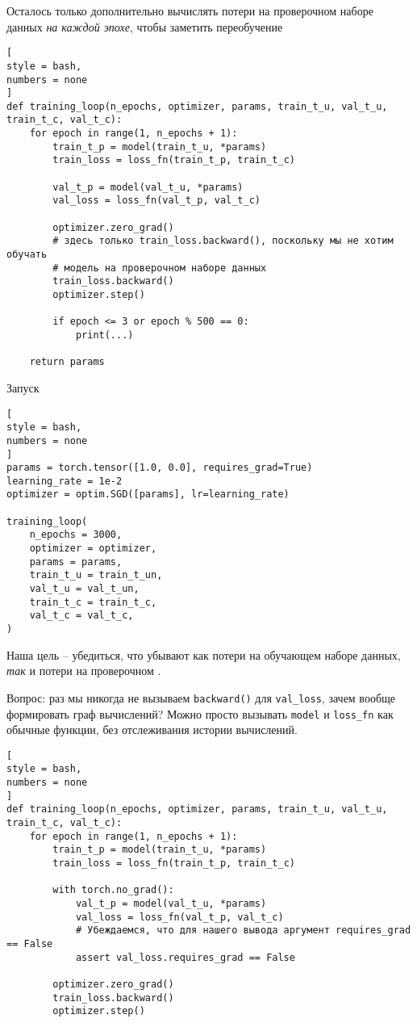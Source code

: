 \documentclass[%
	11pt,
	a4paper,
	utf8,
		]{article}
\begin{document}
Осталось только дополнительно вычислять потери на проверочном наборе данных \emph{на каждой эпохе}, чтобы заметить переобучение
\begin{lstlisting}[
style = bash,
numbers = none
]
def training_loop(n_epochs, optimizer, params, train_t_u, val_t_u, train_t_c, val_t_c):
    for epoch in range(1, n_epochs + 1):
        train_t_p = model(train_t_u, *params)
        train_loss = loss_fn(train_t_p, train_t_c)
        
        val_t_p = model(val_t_u, *params)
        val_loss = loss_fn(val_t_p, val_t_c)
        
        optimizer.zero_grad()
        # здесь только train_loss.backward(), поскольку мы не хотим обучать 
        # модель на проверочном наборе данных
        train_loss.backward()
        optimizer.step()
        
        if epoch <= 3 or epoch % 500 == 0:
            print(...)
            
    return params
\end{lstlisting}

Запуск
\begin{lstlisting}[
style = bash,
numbers = none	
]
params = torch.tensor([1.0, 0.0], requires_grad=True)
learning_rate = 1e-2
optimizer = optim.SGD([params], lr=learning_rate)

training_loop(
    n_epochs = 3000,
    optimizer = optimizer,
    params = params,
    train_t_u = train_t_un,
    val_t_u = val_t_un,
    train_t_c = train_t_c,
    val_t_c = val_t_c,
)
\end{lstlisting}

Наша цель -- убедиться, что убывают как потери на обучающем наборе данных, \emph{так} и потери на проверочном \cite[]{pytorch-2022}.

Вопрос: раз мы никогда не вызываем \verb|backward()| для \verb|val_loss|, зачем вообще формировать граф вычислений? Можно просто вызывать \verb|model| и \verb|loss_fn| как обычные функции, без отслеживания истории вычислений.
\begin{lstlisting}[
style = bash,
numbers = none
]
def training_loop(n_epochs, optimizer, params, train_t_u, val_t_u, train_t_c, val_t_c):
    for epoch in range(1, n_epochs + 1):
        train_t_p = model(train_t_u, *params)
        train_loss = loss_fn(train_t_p, train_t_c)
        
        with torch.no_grad():
            val_t_p = model(val_t_u, *params)
            val_loss = loss_fn(val_t_p, val_t_c)
            # Убеждаемся, что для нашего вывода аргумент requires_grad == False
            assert val_loss.requires_grad == False
        
        optimizer.zero_grad()
        train_loss.backward()
        optimizer.step()
\end{lstlisting}
\end{document}
